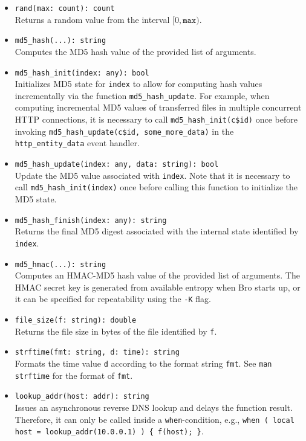 \documentclass[10pt,landscape]{article}
\begin{document}
\begin{multicols*}{2}
\begin{itemize}
  \item \verb|rand(max: count): count|\\
    Returns a random value from the interval $[0, \mathtt{max})$.
  \item \verb|md5_hash(...): string|\\
    Computes the MD5 hash value of the provided list of arguments.
  \item \verb|md5_hash_init(index: any): bool|\\
    Initializes MD5 state for \verb|index| to allow for computing hash values
    incrementally via the function \verb|md5_hash_update|. For example, when
    computing incremental MD5 values of transferred files in multiple
    concurrent HTTP connections, it is necessary to call
    \verb|md5_hash_init(c$id)| once before invoking
    \verb|md5_hash_update(c$id, some_more_data)| in the \verb|http_entity_data|
    event handler.
  \item \verb|md5_hash_update(index: any, data: string): bool|\\
    Update the MD5 value associated with \verb|index|. Note that it is
    necessary to call \verb|md5_hash_init(index)| once before calling this
    function to initialize the MD5 state.
  \item \verb|md5_hash_finish(index: any): string|\\
    Returns the final MD5 digest associated with the internal state identified
    by \verb|index|.
  \item \verb|md5_hmac(...): string|\\
    Computes an HMAC-MD5 hash value of the provided list of arguments. The HMAC
    secret key is generated from available entropy when Bro starts up, or it
    can be specified for repeatability using the \texttt{-K} flag.
  \item \verb|file_size(f: string): double|\\
    Returns the file size in bytes of the file identified by \verb|f|.
  \item \verb|strftime(fmt: string, d: time): string|\\
    Formats the time value \verb|d| according to the format string \verb|fmt|.
    See \verb|man strftime| for the format of \verb|fmt|.
  \item \verb|lookup_addr(host: addr): string|\\
    Issues an asynchronous reverse DNS lookup and delays the function result.
    Therefore, it can only be called inside a \verb|when|-condition, e.g.,
    \verb|when ( local host = lookup_addr(10.0.0.1) ) { f(host); }|.

\end{itemize}
\end{multicols*}
\end{document}
